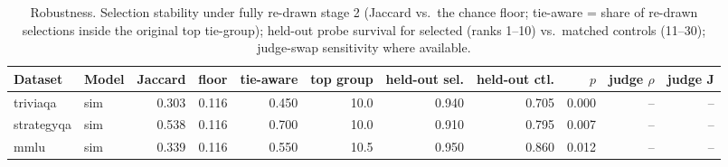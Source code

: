\begin{table}[t]
\centering
\small
\begin{tabular}{llrrrrrrrrr}
\toprule
Dataset & Model & Jaccard & floor & tie-aware & top group & held-out sel. & held-out ctl. & $p$ & judge $\rho$ & judge J \\
\midrule
triviaqa & sim & 0.303 & 0.116 & 0.450 & 10.0 & 0.940 & 0.705 & 0.000 & -- & -- \\
strategyqa & sim & 0.538 & 0.116 & 0.700 & 10.0 & 0.910 & 0.795 & 0.007 & -- & -- \\
mmlu & sim & 0.339 & 0.116 & 0.550 & 10.5 & 0.950 & 0.860 & 0.012 & -- & -- \\
\bottomrule
\end{tabular}
\caption{Robustness. Selection stability under fully re-drawn stage 2 (Jaccard vs.\ the chance floor; tie-aware = share of re-drawn selections inside the original top tie-group); held-out probe survival for selected (ranks 1--10) vs.\ matched controls (11--30); judge-swap sensitivity where available.}
\label{tab:robust}
\end{table}
